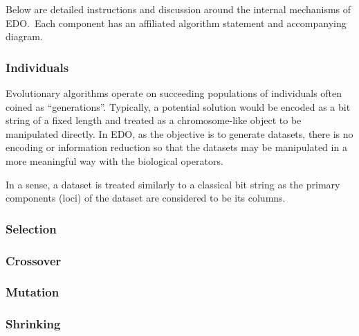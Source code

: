 Below are detailed instructions and discussion around the internal mechanisms of
EDO.\ Each component has an affiliated algorithm statement and accompanying
diagram.

\subsubsection{Individuals}

Evolutionary algorithms operate on succeeding populations of individuals often
coined as ``generations''. Typically, a potential solution would be encoded as a
bit string of a fixed length and treated as a chromosome-like object to be
manipulated directly. In EDO, as the objective is to generate datasets, there is
no encoding or information reduction so that the datasets may be manipulated in
a more meaningful way with the biological operators.

In a sense, a dataset is treated similarly to a classical bit string as the
primary components (loci) of the dataset are considered to be its columns.



\subsubsection{Selection}



\subsubsection{Crossover}



\subsubsection{Mutation}



\subsubsection{Shrinking}

